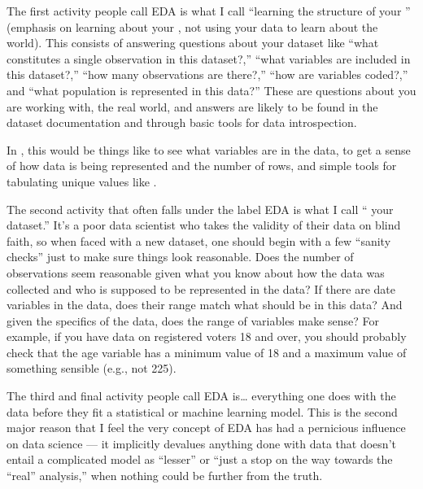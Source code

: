 \documentclass[letterpaper,10pt,english]{jupyterBook}
\begin{document}
\sphinxAtStartPar
The first activity people call EDA is what I call “learning the structure of your ” (emphasis on learning about your , not using your data to learn about the world). This consists of answering questions about your dataset like “what constitutes a single observation in this dataset?,” “what variables are included in this dataset?,” “how many observations are there?,” “how are variables coded?,” and “what population is represented in this data?” These are questions about  you are working with,  the real world, and answers are likely to be found in the dataset documentation and through basic tools for data introspection.%
\begin{footnote}[1]\sphinxAtStartFootnote
In , this would be things like  to see what variables are in the data,  to get a sense of how data is being represented and the number of rows, and simple tools for tabulating unique values like .
%
\end{footnote}

\sphinxAtStartPar
The second activity that often falls under the label EDA is what I call “ your dataset.” It’s a poor data scientist who takes the validity of their data on blind faith, so when faced with a new dataset, one should begin with a few “sanity checks” just to make sure things look reasonable. Does the number of observations seem reasonable given what you know about how the data was collected and who is supposed to be represented in the data? If there are date variables in the data, does their range match what should be in this data? And given the specifics of the data, does the range of variables make sense? For example, if you have data on registered voters 18 and over, you should probably check that the age variable has a minimum value of 18 and a maximum value of something sensible (e.g., not 225).

\sphinxAtStartPar
The third and final activity people call EDA is… everything one does with the data before they fit a statistical or machine learning model. This is the second major reason that I feel the very concept of EDA has had a pernicious influence on data science — it implicitly devalues anything done with data that doesn’t entail a complicated model as “lesser” or “just a stop on the way towards the “real” analysis,” when nothing could be further from the truth.
\end{document}
